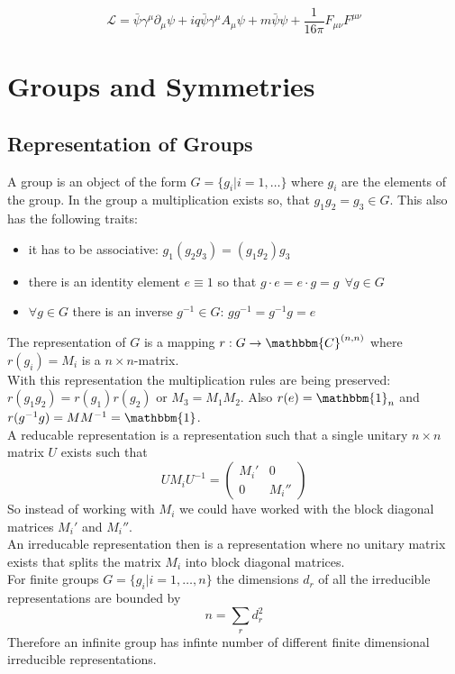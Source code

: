 \documentclass{include/thesisclass}
\newcommand{\LL}{\mathcal{L}}
\newcommand{\cc}{\cdot}
\newcommand{\df}{\rightarrow}
\newcommand{\ehm}{\mathbbm{1}}
\newcommand{\p}{\partial}
\newcommand{\Matz}[4]{\begin{pmatrix}#1&#2\\#3&#4\end{pmatrix}}
\begin{document}
\[
\LL = \bar{\psi} \gamma^\mu \p_\mu \psi + i q \bar{\psi} \gamma^\mu A_\mu \psi + m \bar{\psi}\psi + \frac{1}{16 \pi} F_{\mu\nu}F^{\mu\nu}
\]
%

\chapter{Groups and Symmetries}
\section{Representation of Groups}
A group is an object of the form $G = \{ g_i | i = 1,\ldots\}$ where $g_i$ are the elements of the group. In the group a multiplication exists so, that $g_1 g_2 = g_3 \in G$. This also has the following traits:
\begin{itemize}
\item it has to be associative: $g_1(g_2g_3) = (g_1g_2)g_3$
\item there is an identity element $e \equiv 1$ so that $g\cc e = e \cc g = g ~~\forall g \in G$
\item $\forall g \in G$ there is an inverse $g^{-1} \in G$: $gg^{-1} = g^{-1}g = e$
\end{itemize}
The representation of $G$ is a mapping $r: G \df \mathbbm{C}^{(n,n)}$ where $r(g_i) = M_i$ is a $n\times n$-matrix.\\
With this representation the multiplication rules are being preserved: $r(g_1g_2) = r(g_1)r(g_2)$ or $M_3 = M_1M_2$. Also $r(e) = \ehm_n$ and $r(g^{-1}g) = MM^{-1} = \ehm$.\\
A reducable representation is a representation such that a single unitary $n\times n$ matrix $U$ exists such that
\[ U M_i U^{-1} = \Matz{M_i'}{0}{0}{M_i''}\]
So instead of working with $M_i$ we could have worked with the block diagonal matrices $M_i'$ and $M_i''$.\\
An irreducable representation then is a representation where no unitary matrix exists that splits the matrix $M_i$ into block diagonal matrices.\\
For finite groups $G = \{ g_i | i = 1, \ldots, n \}$ the dimensions $d_r$ of all the irreducible representations are bounded by 
\[n = \sum_r d_r^2\]
Therefore an infinite group has infinte number of different finite dimensional irreducible representations.
\end{document}
